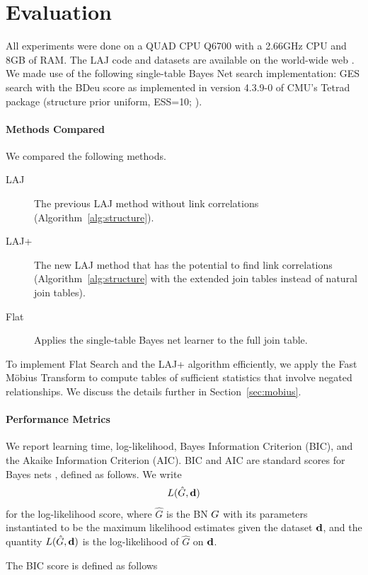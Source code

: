 \documentclass[runningheads,a4paper]{llncs}
\begin{document}
\section{Evaluation} 
All experiments were done on a QUAD CPU Q6700 with a 2.66GHz CPU and 8GB of RAM. The LAJ code and datasets are available on the world-wide web \cite{bib:jbnsite}. We made use of the following single-table Bayes Net search implementation:  GES search \cite{Chickering2003} with the BDeu score as implemented in version 4.3.9-0 of CMU's Tetrad package (structure prior uniform, ESS=10; \cite{2008a}).

\paragraph{Methods Compared}

We compared the following methods.

\begin{description}
\item[LAJ] The previous LAJ method without link correlations (Algorithm~\ref{alg:structure}).
\item[LAJ+] The new LAJ method that has the potential to find link correlations (Algorithm~\ref{alg:structure} with the extended join tables instead of natural join tables).
\item[Flat] Applies the single-table Bayes net learner to the full join table.
\end{description}

To implement Flat Search and the LAJ+ algorithm efficiently, we apply the Fast M\"obius Transform to compute tables of sufficient statistics that involve negated relationships. We discuss the details further in Section~\ref{sec:mobius}.

\paragraph{Performance Metrics} We report learning time, log-likelihood, Bayes Information Criterion (BIC), and the Akaike Information Criterion (AIC). BIC and AIC are standard scores for Bayes nets \cite{Chickering2003}, defined as follows. We write 
$$L(\hat{G},\mathbf{d})$$ for the log-likelihood score,
where $\hat{G}$ is the BN $G$ with its parameters instantiated to be the maximum likelihood estimates given the dataset $\mathbf{d}$, and the quantity $L(\hat{G},\mathbf{d})$ is the log-likelihood of $\hat{G}$ on $\mathbf{d}$. 

The BIC score is defined as follows \cite{Chickering2003,Schulte2011}
\end{document}
